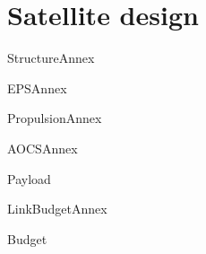 \chapter{Satellite design}

{StructureAnnex}

{EPSAnnex}

{PropulsionAnnex}

{AOCSAnnex}

{Payload}

{LinkBudgetAnnex}

{Budget}

